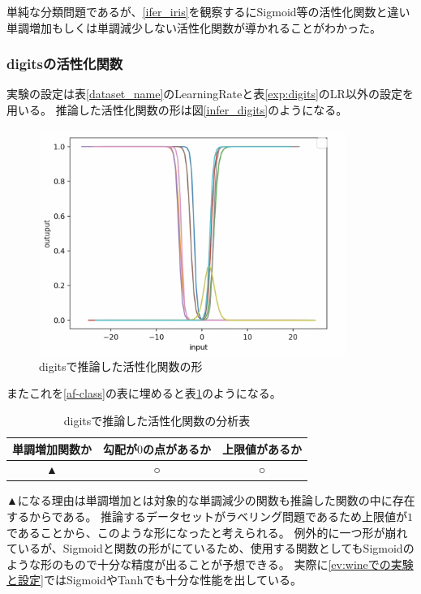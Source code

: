 単純な分類問題であるが、\ref{ifer_iris}を観察するにSigmoid等の活性化関数と違い単調増加もしくは単調減少しない活性化関数が導かれることがわかった。




\subsubsection{digitsの活性化関数}
実験の設定は表\ref{dataset_name}のLearningRateと表\ref{exp:digits}のLR以外の設定を用いる。
推論した活性化関数の形は図\ref{infer_digits}のようになる。
\begin{figure}[hbtp]
    \begin{center}
        \includegraphics[width=10cm]{asset/digits-0.1.png}
            \caption{digitsで推論した活性化関数の形}
            \label{ifer_digits}
    \end{center}
\end{figure}

またこれを\ref{af-class}の表に埋めると表\ref{anal_digits}のようになる。
\begin{table}[htbp]
    \begin{center}
        \caption{digitsで推論した活性化関数の分析表}
        \label{anal_digits}
        \vspace{2mm} 
        \begin{tabular}{ |c|c|c| }
        単調増加関数か & 勾配が$ 0 $の点があるか & 上限値があるか   \\
        \hline
        ▲ & ○ & ○   \\
        \end{tabular}
    \end{center}
\end{table}

▲になる理由は単調増加とは対象的な単調減少の関数も推論した関数の中に存在するからである。
推論するデータセットがラベリング問題であるため上限値が$ 1 $であることから、このような形になったと考えられる。
例外的に一つ形が崩れているが、Sigmoidと関数の形がにているため、使用する関数としてもSigmoidのような形のもので十分な精度が出ることが予想できる。
実際に\ref{ev:wineでの実験と設定}ではSigmoidやTanhでも十分な性能を出している。





